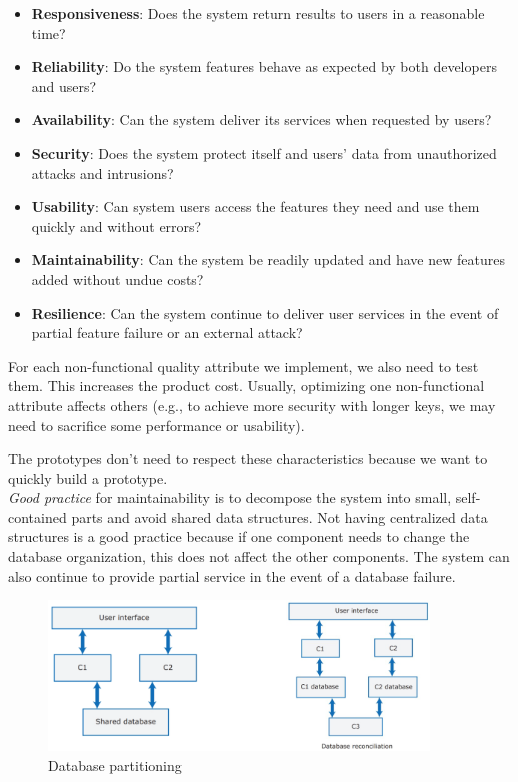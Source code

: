 \begin{itemize}
    \item \textbf{Responsiveness}: Does the system return results to users in a reasonable time? 
    \item \textbf{Reliability}: Do the system features behave as expected by both developers and users? 
    \item \textbf{Availability}: Can the system deliver its services when requested by users?
    \item \textbf{Security}: Does the system protect itself and users' data from unauthorized attacks and intrusions?
    \item \textbf{Usability}: Can system users access the features they need and use them quickly and without errors? 
    \item \textbf{Maintainability}: Can the system be readily updated and have new features added without undue costs?
    \item \textbf{Resilience}: Can the system continue to deliver user services in the event of partial feature failure or an external attack?
\end{itemize}

For each non-functional quality attribute we implement, we also need to test them. This increases the product cost. 
Usually, optimizing one non-functional attribute affects others (e.g., to achieve more security with longer keys, we may need to sacrifice some performance or usability).

The prototypes don't need to respect these characteristics because we want to quickly build a prototype. \\

\emph{Good practice} for maintainability is to decompose the system into small, self-contained parts and avoid shared data structures. Not having centralized data structures is a good practice because if one component needs to change the database organization, this does not affect the other components. The system can also continue to provide partial service in the event of a database failure.

\begin{figure} [H]
    \centering
    \includegraphics[width=0.9\textwidth]{images/SoftwareArchitecture/shattedDB.png}
    \caption{Database partitioning}
    \label{fig:shattedDB}
\end{figure} 

